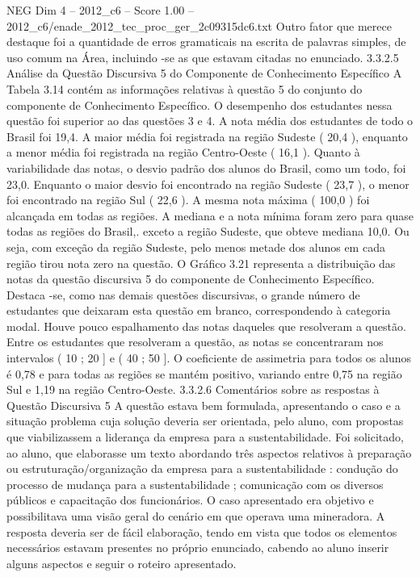 \begin{textsample}{NEG Dim 4 – 2012\_c6 – Score 1.00 – 2012\_c6/enade\_2012\_tec\_proc\_ger\_2c09315dc6.txt}
Outro fator que merece destaque foi a quantidade de erros gramaticais na escrita de palavras simples, de uso comum na Área, incluindo -se as que estavam citadas no enunciado. 3.3.2.5 Análise da Questão Discursiva 5 do Componente de Conhecimento Específico A Tabela 3.14 contém as informações relativas à questão 5 do conjunto do componente de Conhecimento Específico.
O desempenho dos estudantes nessa questão foi superior ao das questões 3 e 4.
A nota média dos estudantes de todo o Brasil foi 19,4.
A maior média foi registrada na região Sudeste ( 20,4 ), enquanto a menor média foi registrada na região Centro-Oeste ( 16,1 ).
Quanto à variabilidade das notas, o desvio padrão dos alunos do Brasil, como um todo, foi 23,0.
Enquanto o maior desvio foi encontrado na região Sudeste ( 23,7 ), o menor foi encontrado na região Sul ( 22,6 ).
A mesma nota máxima ( 100,0 ) foi alcançada em todas as regiões.
A mediana e a nota mínima foram zero para quase todas as regiões do Brasil,. exceto a região Sudeste, que obteve mediana 10,0.
Ou seja, com exceção da região Sudeste, pelo menos metade dos alunos em cada região tirou nota zero na questão.
O Gráfico 3.21 representa a distribuição das notas da questão discursiva 5 do componente de Conhecimento Específico.
Destaca -se, como nas demais questões discursivas, o grande número de estudantes que deixaram esta questão em branco, correspondendo à categoria modal.
Houve pouco espalhamento das notas daqueles que resolveram a questão.
Entre os estudantes que resolveram a questão, as notas se concentraram nos intervalos ( 10 ; 20 ] e ( 40 ; 50 ].
O coeficiente de assimetria para todos os alunos é 0,78 e para todas as regiões se mantém positivo, variando entre 0,75 na região Sul e 1,19 na região Centro-Oeste. 3.3.2.6 Comentários sobre as respostas à Questão Discursiva 5 A questão estava bem formulada, apresentando o caso e a situação problema cuja solução deveria ser orientada, pelo aluno, com propostas que viabilizassem a liderança da empresa para a sustentabilidade.
Foi solicitado, ao aluno, que elaborasse um texto abordando três aspectos relativos à preparação ou estruturação/organização da empresa para a sustentabilidade : condução do processo de mudança para a sustentabilidade ; comunicação com os diversos públicos e capacitação dos funcionários.
O caso apresentado era objetivo e possibilitava uma visão geral do cenário em que operava uma mineradora.
A resposta deveria ser de fácil elaboração, tendo em vista que todos os elementos necessários estavam presentes no próprio enunciado, cabendo ao aluno inserir alguns aspectos e seguir o roteiro apresentado.

\end{textsample}
